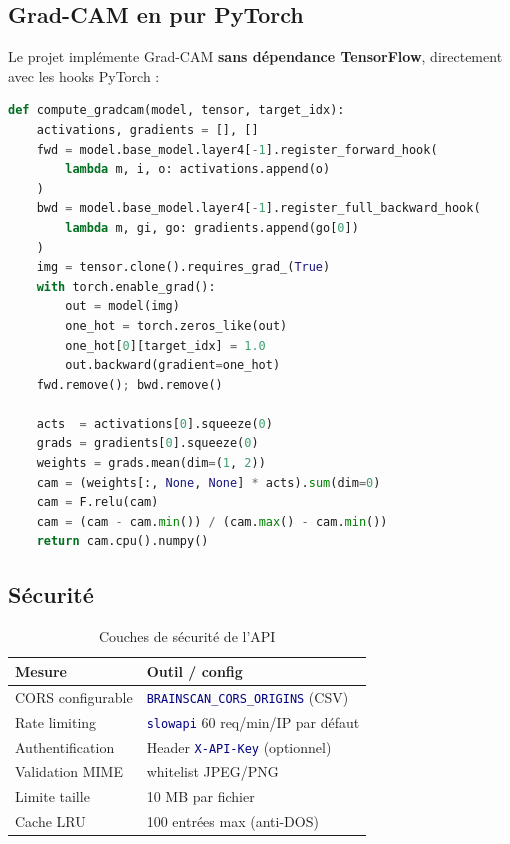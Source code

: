 \documentclass[11pt,a4paper,oneside]{report}
\newcommand{\code}[1]{\texttt{\textcolor{navy}{#1}}}
\begin{document}
\subsection{Grad-CAM en pur PyTorch}

Le projet implémente Grad-CAM \textbf{sans dépendance TensorFlow}, directement avec les hooks PyTorch :

\begin{lstlisting}[language=Python, caption={Grad-CAM via hooks (extrait)}]
def compute_gradcam(model, tensor, target_idx):
    activations, gradients = [], []
    fwd = model.base_model.layer4[-1].register_forward_hook(
        lambda m, i, o: activations.append(o)
    )
    bwd = model.base_model.layer4[-1].register_full_backward_hook(
        lambda m, gi, go: gradients.append(go[0])
    )
    img = tensor.clone().requires_grad_(True)
    with torch.enable_grad():
        out = model(img)
        one_hot = torch.zeros_like(out)
        one_hot[0][target_idx] = 1.0
        out.backward(gradient=one_hot)
    fwd.remove(); bwd.remove()

    acts  = activations[0].squeeze(0)
    grads = gradients[0].squeeze(0)
    weights = grads.mean(dim=(1, 2))
    cam = (weights[:, None, None] * acts).sum(dim=0)
    cam = F.relu(cam)
    cam = (cam - cam.min()) / (cam.max() - cam.min())
    return cam.cpu().numpy()
\end{lstlisting}

\subsection{Sécurité}

\begin{table}[!htbp]
\centering
\caption{Couches de sécurité de l'API}
\begin{tabular}{|l|l|}
\hline
\textbf{Mesure} & \textbf{Outil / config} \\
\hline
CORS configurable & \code{BRAINSCAN\_CORS\_ORIGINS} (CSV) \\
\hline
Rate limiting & \code{slowapi} 60 req/min/IP par défaut \\
\hline
Authentification & Header \code{X-API-Key} (optionnel) \\
\hline
Validation MIME & whitelist JPEG/PNG \\
\hline
Limite taille & 10 MB par fichier \\
\hline
Cache LRU & 100 entrées max (anti-DOS) \\
\hline
\end{tabular}
\end{table}
\end{document}
